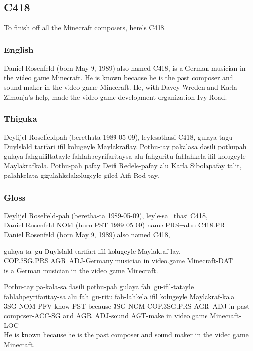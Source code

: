 \newpage

\subsection{C418}
To finish off all the Minecraft composers, here's C418.

\subsubsection*{English}
Daniel Rosenfeld (born May 9, 1989) also named C418, is a German musician in the video game Minecraft.
He is known because he is the past composer and sound maker in the video game Minecraft.
He, with Davey Wreden and Karla Zimonja's help, made the video game development organization Ivy Road.

\subsubsection*{Thiguka}
Deylijel Roselfeldpah (berethata 1989-05-09), leylesathasi C418, gulaya tagu-Duylslald tarifari ifil kolugeyle Maylakraflay.
Pothu-tay pakalasa dasili pothupah gulaya fahguifiltatayle fahlahpeyrifaritaysa alu fahguritu fahlahkela ifil kolugeyle Maylakrafkala.
Pothu-pah pafay Deifi Redele-pafay alu Karla Sibolapafay talit, palahkelata gigulahkelakolugeyle giled Aifi Rod-tay.

\subsubsection*{Gloss}

\begin{exe}
    \ex{} \gll{}Deylijel Roselfeld-pah (beretha-ta 1989-05-09), leyle-sa=thasi C418,\\
                Daniel Rosenfeld-NOM (born-PST 1989-05-09) name-PRS=also C418.PR\\
          \glt{}Daniel Rosenfeld (born May 9, 1989) also named C418,
\end{exe}

\begin{exe}
    \ex{} \gll{}gulaya ta~gu-Duylslald tarifari ifil kolugeyle Maylakraf-lay.\\
                COP.3SG.PRS AGR~ADJ-Germany musician in video.game Minecraft-DAT\\
          \glt{}is a German musician in the video game Minecraft.
\end{exe}

\begin{exe}
    \ex{} \gll{}Pothu-tay pa-kala-sa dasili pothu-pah gulaya fah~gu-ifil-tatayle fahlahpeyrifaritay-sa alu fah~gu-ritu fah-lahkela ifil kolugeyle Maylakraf-kala\\
                3SG-NOM PFV-know-PST because 3SG-NOM COP.3SG.PRS AGR~ADJ-in-past composer-ACC-SG and AGR~ADJ-sound AGT-make in video.game Minecraft-LOC\\
          \glt{}He is known because he is the past composer and sound maker in the video game Minecraft.
\end{exe}

